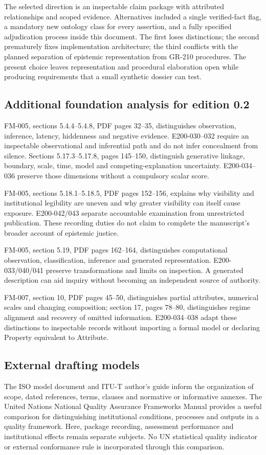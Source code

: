 \documentclass[11pt,a4paper]{article}
\begin{document}
The selected direction is an inspectable claim package with attributed relationships and scoped evidence. Alternatives included a single verified-fact flag, a mandatory new ontology class for every assertion, and a fully specified adjudication process inside this document. The first loses distinctions; the second prematurely fixes implementation architecture; the third conflicts with the planned separation of epistemic representation from GR-210 procedures. The present choice leaves representation and procedural elaboration open while producing requirements that a small synthetic dossier can test.


\subsection{Additional foundation analysis for edition 0.2}
FM-005, sections 5.4.4--5.4.8, PDF pages 32--35, distinguishes observation, inference, latency, hiddenness and negative evidence. E200-030--032 require an inspectable observational and inferential path and do not infer concealment from silence. Sections 5.17.3--5.17.8, pages 145--150, distinguish generative linkage, boundary, scale, time, model and competing-explanation uncertainty. E200-034--036 preserve those dimensions without a compulsory scalar score.

FM-005, sections 5.18.1--5.18.5, PDF pages 152--156, explains why visibility and institutional legibility are uneven and why greater visibility can itself cause exposure. E200-042/043 separate accountable examination from unrestricted publication. These recording duties do not claim to complete the manuscript's broader account of epistemic justice.

FM-005, section 5.19, PDF pages 162--164, distinguishes computational observation, classification, inference and generated representation. E200-033/040/041 preserve transformations and limits on inspection. A generated description can aid inquiry without becoming an independent source of authority.

FM-007, section 10, PDF pages 45--50, distinguishes partial attributes, numerical scales and changing composition; section 17, pages 78--80, distinguishes regime alignment and recovery of omitted information. E200-034--038 adapt these distinctions to inspectable records without importing a formal model or declaring Property equivalent to Attribute.

\subsection{External drafting models}
The ISO model document and ITU-T author's guide inform the organization of scope, dated references, terms, clauses and normative or informative annexes. The United Nations National Quality Assurance Frameworks Manual provides a useful comparison for distinguishing institutional conditions, processes and outputs in a quality framework. Here, package recording, assessment performance and institutional effects remain separate subjects. No UN statistical quality indicator or external conformance rule is incorporated through this comparison.
\end{document}
